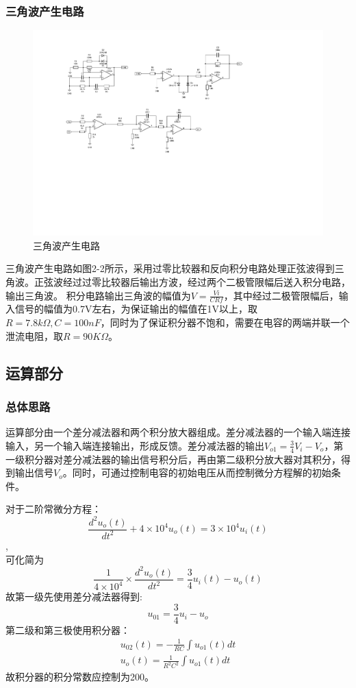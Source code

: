 \documentclass[a4paper]{article}
\theoremstyle{definition}
\theoremstyle{plain}
\theoremstyle{remark}
\begin{document}
\subsubsection{三角波产生电路}
\begin{figure}[H]
	\centering
	\includegraphics[width=1.0\textwidth]{三角波产生电路}
	\caption{三角波产生电路}
\end{figure}
三角波产生电路如图2-2所示，采用过零比较器和反向积分电路处理正弦波得到三角波。正弦波经过过零比较器后输出方波，经过两个二极管限幅后送入积分电路，输出三角波。
积分电路输出三角波的幅值为$V=\frac{Vi}{CRf}$，其中经过二极管限幅后，输入信号的幅值为0.7V左右，为保证输出的幅值在1V以上，取$R=7.8k\Omega,C=100nF$，同时为了保证积分器不饱和，需要在电容的两端并联一个泄流电阻，取$R=90K\Omega$。

\subsection{运算部分}
\subsubsection{总体思路}
运算部分由一个差分减法器和两个积分放大器组成。差分减法器的一个输入端连接输入，另一个输入端连接输出，形成反馈。差分减法器的输出$V_{o1}=\frac{3}{4}V_i-V_o$，第一级积分器对差分减法器的输出信号积分后，再由第二级积分放大器对其积分，得到输出信号$V_o$。同时，可通过控制电容的初始电压从而控制微分方程解的初始条件。

对于二阶常微分方程：$$\frac{d^2u_o(t)}{dt^2}+4\times10^4u_o(t)=3\times10^4u_i(t)$$,\\可化简为$$\frac{1}{4\times10^4}\times\frac{d^2u_o(t)}{dt^2}=\frac{3}{4}u_i(t)-u_o(t)$$
故第一级先使用差分减法器得到:
$$u_{01}=\frac{3}{4}u_i-u_o$$
第二级和第三极使用积分器：
\begin{equation}
	\begin{aligned}
		u_{02}(t)=-\frac{1}{RC}\int u_{o1}(t)dt \\ u_o(t)=\frac{1}{R^2 C^2}\int u_{o1}(t)dt
	\end{aligned}
	\nonumber
\end{equation}
故积分器的积分常数应控制为200。
\end{document}
